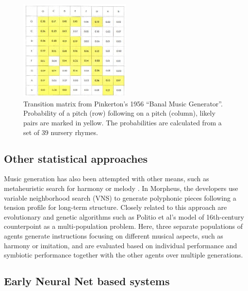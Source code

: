 \begin{figure}[H]
    \centering
    \includegraphics[width=0.5\textwidth]{IMAGES/PinkertonNurseryRhymes.jpg} 
    \caption{Transition matrix from Pinkerton's 1956 “Banal Music Generator”. Probability of a pitch (row) following on a pitch (column), likely pairs are marked in yellow. The probabilities are calculated from a set of 39 nursery rhymes.}
    \label{fig:pinkertonmatrix}
\end{figure}\subsection{Other statistical approaches}
Music generation has also been attempted with other means, such as metaheuristic search for harmony or melody \cite{Altay_Alatas_2018}. In Morpheus, \cite{Herremans_Chew_Morpheus_2019} the developers use variable neighborhood search (VNS) to generate polyphonic pieces following a tension profile for long-term structure. Closely related to this approach are evolutionary and genetic algorithms such as Politio et al's \cite{Polito_Daida_Bersano-Begey_1997} model of 16th-century counterpoint as a multi-population problem. Here, three separate populations of agents generate instructions focusing on different musical aspects, such as harmony or imitation, and are evaluated based on individual performance and symbiotic performance together with the other agents over multiple generations. 


\subsection{Early Neural Net based systems}

